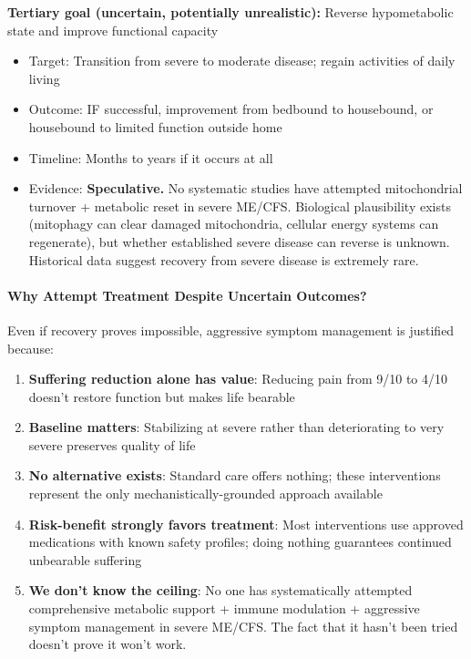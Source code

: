 \begin{keypoint}
\textbf{Tertiary goal (uncertain, potentially unrealistic):} Reverse hypometabolic state and improve functional capacity
\begin{itemize}
    \item Target: Transition from severe to moderate disease; regain activities of daily living
    \item Outcome: IF successful, improvement from bedbound to housebound, or housebound to limited function outside home
    \item Timeline: Months to years if it occurs at all
    \item Evidence: \textbf{Speculative.} No systematic studies have attempted mitochondrial turnover + metabolic reset in severe ME/CFS. Biological plausibility exists (mitophagy can clear damaged mitochondria, cellular energy systems can regenerate), but whether established severe disease can reverse is unknown. Historical data suggest recovery from severe disease is extremely rare.
\end{itemize}
\end{keypoint}

\paragraph{Why Attempt Treatment Despite Uncertain Outcomes?}

Even if recovery proves impossible, aggressive symptom management is justified because:

\begin{enumerate}
    \item \textbf{Suffering reduction alone has value}: Reducing pain from 9/10 to 4/10 doesn't restore function but makes life bearable

    \item \textbf{Baseline matters}: Stabilizing at severe rather than deteriorating to very severe preserves quality of life

    \item \textbf{No alternative exists}: Standard care offers nothing; these interventions represent the only mechanistically-grounded approach available

    \item \textbf{Risk-benefit strongly favors treatment}: Most interventions use approved medications with known safety profiles; doing nothing guarantees continued unbearable suffering

    \item \textbf{We don't know the ceiling}: No one has systematically attempted comprehensive metabolic support + immune modulation + aggressive symptom management in severe ME/CFS. The fact that it hasn't been tried doesn't prove it won't work.
\end{enumerate}

